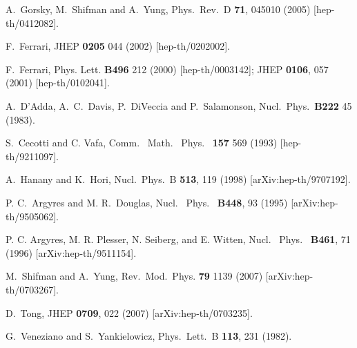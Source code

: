 \documentclass[epsfig,12pt]{article}
\newcommand{\ntwo}{${\mathcal N}=2\,$}
\begin{document}
{\begin{thebibliography}{99}
A.~Gorsky, M.~Shifman and A.~Yung,
Phys.\ Rev.\ D {\bf 71}, 045010 (2005)
[hep-th/0412082].

F.~Ferrari,
JHEP {\bf 0205} 044 (2002)
[hep-th/0202002].

F.~Ferrari,
 Phys. Lett. {\bf B496} 212 (2000)
[hep-th/0003142];
JHEP {\bf 0106}, 057 (2001)
[hep-th/0102041].

A.~D'Adda, A.~C.~Davis, P.~DiVeccia and P.~Salamonson,
Nucl.\ Phys.\ {\bf B222} 45 (1983).

S.~Cecotti and C. Vafa,
Comm. \ Math. \ Phys. \ {\bf 157} 569 (1993)
[hep-th/9211097].

A.~Hanany and K.~Hori,
  Nucl.\ Phys.\  B {\bf 513}, 119 (1998)
  [arXiv:hep-th/9707192].

P. C.~Argyres and M. R.~Douglas,
Nucl. \ Phys. \ {\bf B448}, 93 (1995)   
[arXiv:hep-th/9505062].
  
P. C. Argyres, M. R. Plesser, N. Seiberg, and E. Witten,
Nucl. \ Phys.  \ {\bf B461}, 71 (1996) 
[arXiv:hep-th/9511154].

M.~Shifman and A.~Yung,
Rev.\ Mod.\ Phys. {\bf 79} 1139 (2007)
[arXiv:hep-th/0703267].

  D.~Tong,
  JHEP {\bf 0709}, 022 (2007)
  [arXiv:hep-th/0703235].
  
 G.~Veneziano and S.~Yankielowicz,
  Phys.\ Lett.\  B {\bf 113}, 231 (1982).
  

\end{thebibliography}}
\end{document}
